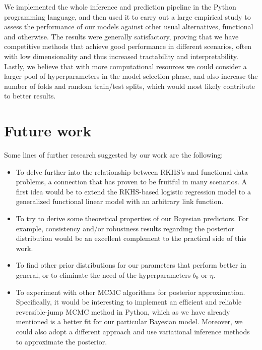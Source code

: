 We implemented the whole inference and prediction pipeline in the Python programming language, and then used it to carry out a large empirical study to assess the performance of our models against other usual alternatives, functional and otherwise. The results were generally satisfactory, proving that we have competitive methods that achieve good performance in different scenarios, often with low dimensionality and thus increased tractability and interpretability. Lastly, we believe that with more computational resources we could consider a larger pool of hyperparameters in the model selection phase, and also increase the number of folds and random train/test splits, which would most likely contribute to better results.

\section{Future work}

Some lines of further research suggested by our work are the following:

\begin{itemize}
  \item To delve further into the relationship between RKHS's and functional data problems, a connection that has proven to be fruitful in many scenarios. A first idea would be to extend the RKHS-based logistic regression model to a generalized functional linear model with an arbitrary link function.
  \item To try to derive some theoretical properties of our Bayesian predictors. For example, consistency and/or robustness results regarding the posterior distribution would be an excellent complement to the practical side of this work.
  \item To find other prior distributions for our parameters that perform better in general, or to eliminate the need of the hyperparameters \(b_0\) or \(\eta\).
  \item To experiment with other MCMC algorithms for posterior approximation. Specifically, it would be interesting to implement an efficient and reliable reversible-jump MCMC method in Python, which as we have already mentioned is a better fit for our particular Bayesian model. Moreover, we could also adopt a different approach and use variational inference methods to approximate the posterior.
\end{itemize}

